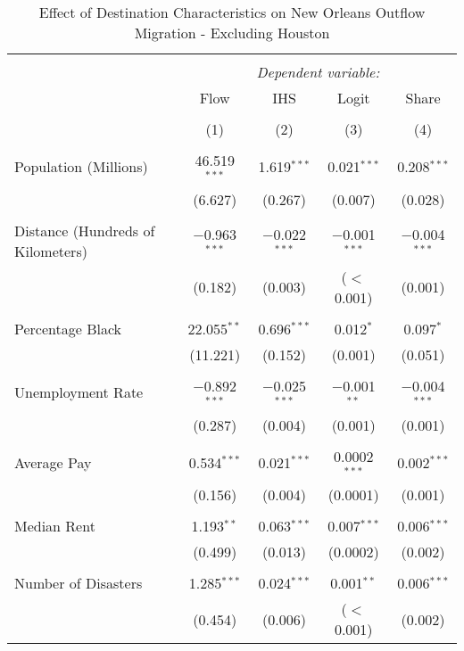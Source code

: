 \documentclass[]{article}
\begin{document}
\begin{table}[!htbp] \centering 
  \caption{\label{reg:regnohor}Effect of Destination Characteristics on New Orleans Outflow Migration - Excluding Houston} 
  \label{} 
\scriptsize 
\begin{tabular}{@{\extracolsep{5pt}}lcccc} 
\\[-1.8ex]\hline 
\hline \\[-1.8ex] 
 & \multicolumn{4}{c}{\textit{Dependent variable:}} \\ 
\cline{2-5} 
 & Flow & IHS & Logit & Share \\ 
\\[-1.8ex] & (1) & (2) & (3) & (4)\\ 
\hline \\[-1.8ex] 
 Population (Millions) & 46.519$^{***}$ & 1.619$^{***}$ & 0.021$^{***}$ & 0.208$^{***}$ \\ 
  & (6.627) & (0.267) & (0.007) & (0.028) \\ 
  & & & & \\ 
 Distance (Hundreds of Kilometers) & $-$0.963$^{***}$ & $-$0.022$^{***}$ & $-$0.001$^{***}$ & $-$0.004$^{***}$ \\ 
  & (0.182) & (0.003) & ($<$0.001) & (0.001) \\ 
  & & & & \\ 
 Percentage Black & 22.055$^{**}$ & 0.696$^{***}$ & 0.012$^{*}$ & 0.097$^{*}$ \\ 
  & (11.221) & (0.152) & (0.001) & (0.051) \\ 
  & & & & \\ 
 Unemployment Rate & $-$0.892$^{***}$ & $-$0.025$^{***}$ & $-$0.001$^{**}$ & $-$0.004$^{***}$ \\ 
  & (0.287) & (0.004) & (0.001) & (0.001) \\ 
  & & & & \\ 
 Average Pay & 0.534$^{***}$ & 0.021$^{***}$ & 0.0002$^{***}$ & 0.002$^{***}$ \\ 
  & (0.156) & (0.004) & (0.0001) & (0.001) \\ 
  & & & & \\ 
 Median Rent & 1.193$^{**}$ & 0.063$^{***}$ & 0.007$^{***}$ & 0.006$^{***}$ \\ 
  & (0.499) & (0.013) & (0.0002) & (0.002) \\ 
  & & & & \\ 
 Number of Disasters & 1.285$^{***}$ & 0.024$^{***}$ & 0.001$^{**}$ & 0.006$^{***}$ \\ 
  & (0.454) & (0.006) & ($<$0.001) & (0.002) \\ 

\end{tabular}
\end{table}
\end{document}
